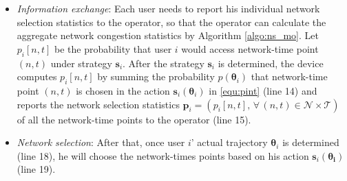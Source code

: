 \documentclass[journal]{IEEEtran}
\newcommand{\mc}[1]{\mathcal{#1}}
\newcommand{\bs}[1]{\boldsymbol{#1}}
\begin{document}
\begin{itemize}
	\item \emph{Information exchange}: Each user needs to report his individual network selection statistics to the operator, so that the operator can calculate the aggregate network congestion statistics by Algorithm \ref{algo:ns_mo}.
	Let $p_i[n,t]$ be the probability that user $i$ would access network-time point $(n,t)$ under strategy $\bs{s}_i$. 
	After the strategy $\bs{s}_i$ is determined, the device computes $p_i[n,t]$ by summing the probability $p(\bs{\theta}_i)$ that network-time point $(n,t)$ is chosen in the action $\bs{s}_i(\bs{\theta}_i)$ in \eqref{equ:pint} (line 14) and reports the network selection statistics $\boldsymbol{p}_i = (p_i[n,t], \, \forall \, (n,t) \in \mathcal{N} \times \mathcal{T})$ of all the network-time points to the operator (line 15).
	
	\item \emph{Network selection}: After that, once user $i$' actual trajectory $\boldsymbol{\theta}_i$ is determined (line 18), he will choose the network-times points based on his action $\boldsymbol{s}_i(\boldsymbol{\theta_i})$ (line 19). %
	
\end{itemize}
	

\end{document}
